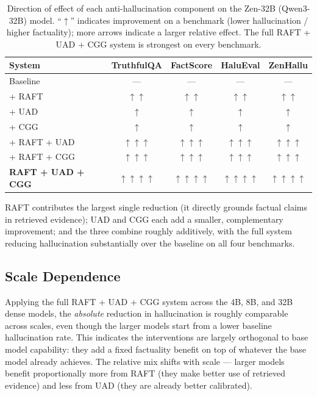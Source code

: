 \documentclass[11pt,a4paper]{article}
\begin{document}
\begin{table}[H]
\centering
\caption{Direction of effect of each anti-hallucination component on the Zen-32B
(Qwen3-32B) model. ``$\uparrow$'' indicates improvement on a benchmark (lower hallucination
/ higher factuality); more arrows indicate a larger relative effect. The full
RAFT + UAD + CGG system is strongest on every benchmark.}
\begin{tabular}{lcccc}
\toprule
\textbf{System} & \textbf{TruthfulQA} & \textbf{FactScore} & \textbf{HaluEval} & \textbf{ZenHallu} \\
\midrule
Baseline               & ---  & ---  & ---  & --- \\
+ RAFT                 & $\uparrow\uparrow$   & $\uparrow\uparrow$   & $\uparrow\uparrow$   & $\uparrow\uparrow$ \\
+ UAD                  & $\uparrow$    & $\uparrow$    & $\uparrow$    & $\uparrow$ \\
+ CGG                  & $\uparrow$    & $\uparrow$    & $\uparrow$    & $\uparrow$ \\
+ RAFT + UAD           & $\uparrow\uparrow\uparrow$  & $\uparrow\uparrow\uparrow$  & $\uparrow\uparrow\uparrow$  & $\uparrow\uparrow\uparrow$ \\
+ RAFT + CGG           & $\uparrow\uparrow\uparrow$  & $\uparrow\uparrow\uparrow$  & $\uparrow\uparrow\uparrow$  & $\uparrow\uparrow\uparrow$ \\
\textbf{RAFT + UAD + CGG} & $\uparrow\uparrow\uparrow\uparrow$ & $\uparrow\uparrow\uparrow\uparrow$ & $\uparrow\uparrow\uparrow\uparrow$ & $\uparrow\uparrow\uparrow\uparrow$ \\
\bottomrule
\end{tabular}
\label{tab:main_results}
\end{table}

RAFT contributes the largest single reduction (it directly grounds factual claims in
retrieved evidence); UAD and CGG each add a smaller, complementary improvement; and the
three combine roughly additively, with the full system reducing hallucination
substantially over the baseline on all four benchmarks.

\subsection{Scale Dependence}

Applying the full RAFT + UAD + CGG system across the 4B, 8B, and 32B dense models, the
\emph{absolute} reduction in hallucination is roughly comparable across scales, even
though the larger models start from a lower baseline hallucination rate. This indicates
the interventions are largely orthogonal to base model capability: they add a fixed
factuality benefit on top of whatever the base model already achieves. The relative
mix shifts with scale — larger models benefit proportionally more from RAFT (they make
better use of retrieved evidence) and less from UAD (they are already better calibrated).
\end{document}
